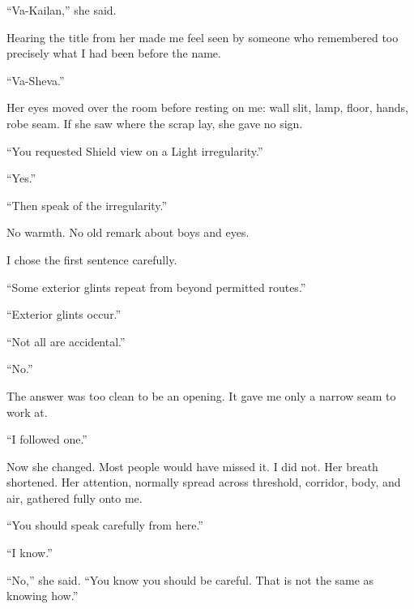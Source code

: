 ``Va-Kailan,'' she said.\par

Hearing the title from her made me feel seen by someone who remembered too precisely what I had been before the name.\par

``Va-Sheva.''\par

Her eyes moved over the room before resting on me: wall slit, lamp, floor, hands, robe seam. If she saw where the scrap lay, she gave no sign.\par

``You requested Shield view on a Light irregularity.''\par

``Yes.''\par

``Then speak of the irregularity.''\par

No warmth. No old remark about boys and eyes.\par

I chose the first sentence carefully.\par

``Some exterior glints repeat from beyond permitted routes.''\par

``Exterior glints occur.''\par

``Not all are accidental.''\par

``No.''\par

The answer was too clean to be an opening. It gave me only a narrow seam to work at.\par

``I followed one.''\par

Now she changed. Most people would have missed it. I did not. Her breath shortened. Her attention, normally spread across threshold, corridor, body, and air, gathered fully onto me.\par

``You should speak carefully from here.''\par

``I know.''\par

``No,'' she said. ``You know you should be careful. That is not the same as knowing how.''\par

